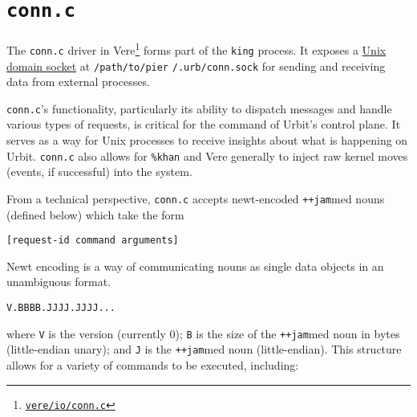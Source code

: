 \documentclass[twoside]{article}
\begin{document}
\section{\texttt{conn.c}} 

The \texttt{conn.c} driver in Vere\footnote{\href{https://github.com/urbit/vere/blob/develop/pkg/vere/io/conn.c}{\texttt{vere/io/conn.c}}} forms part of the \texttt{king} process.  It exposes a \href{https://en.wikipedia.org/wiki/Unix_domain_socket}{Unix domain socket} at \texttt{/path/to/pier} \texttt{/.urb/conn.sock} for sending and receiving data from external processes.

\texttt{conn.c}'s functionality, particularly its ability to dispatch messages and handle various types of requests, is critical for the command of Urbit's control plane.  It serves as a way for Unix processes to receive insights about what is happening on Urbit.  \texttt{conn.c} also allows for \texttt{\%khan} and Vere generally to inject raw kernel moves (events, if successful) into the system.

From a technical perspective, \texttt{conn.c} accepts newt-encoded \lstinline[style=inlinecode]{++jam}med nouns (defined below) which take the form
\begin{lstlisting}[style=listingblock]
[request-id command arguments]
\end{lstlisting}
\noindent
Newt encoding is a way of communicating nouns as single data objects in an unambiguous format.

\begin{lstlisting}[style=listingblock]
V.BBBB.JJJJ.JJJJ...
\end{lstlisting}
\noindent
where \texttt{V} is the version (currently 0); \texttt{B} is the size of the \lstinline[style=inlinecode]{++jam}med noun in bytes (little-endian unary); and \texttt{J} is the \lstinline[style=inlinecode]{++jam}med noun (little-endian).  This structure allows for a variety of commands to be executed, including:
\end{document}
